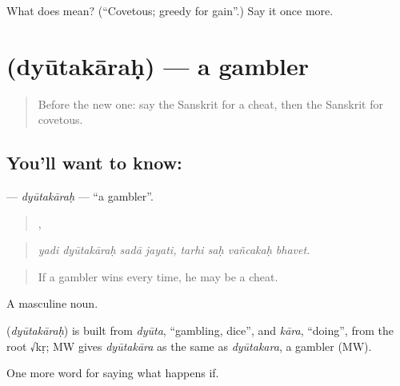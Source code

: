 \begin{tcolorbox}[breakable,colback=teal!4,colframe=teal!35!black,title={Before you move on}]
What does  mean? (\textquotedblleft{}Covetous; greedy for gain\textquotedblright{}.) Say it once more.
\end{tcolorbox}
\section[\texorpdfstring{\sk{द्यूतकारः} (dyūtakāraḥ)}{द्यूतकारः (dyūtakāraḥ)}]{ (dyūtakāraḥ) — a gambler}

\label{lesson:SA-C537-dyutakarah}



\begin{quote}
Before the new one: say the Sanskrit for a cheat, then the Sanskrit for covetous.
\end{quote}

\subsection*{You'll want to know: }
\textbf{} — \emph{dyūtakāraḥ} — \textquotedblleft{}a gambler\textquotedblright{}.

\begin{quote}
   ,    
\end{quote}

\begin{quote}
\emph{yadi dyūtakāraḥ sadā jayati, tarhi saḥ vañcakaḥ bhavet.}
\end{quote}

\begin{quote}
If a gambler wins every time, he may be a cheat.
\end{quote}

A masculine noun.

\begin{cousinweb}
\textbf{} (\emph{dyūtakāraḥ}) is built from \emph{dyūta}, \textquotedblleft{}gambling, dice\textquotedblright{}, and \emph{kāra}, \textquotedblleft{}doing\textquotedblright{}, from the root √kṛ; MW gives \emph{dyūtakāra} as the same as \emph{dyūtakara}, a gambler (MW).
\end{cousinweb}

\begin{grammarlens}[title={What you've built}]
One more word for saying what happens if.
\end{grammarlens}

